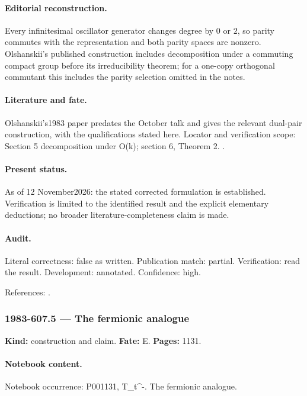 \paragraph{Editorial reconstruction.} Every infinitesimal oscillator generator changes degree by \(0\) or \(2\), so parity commutes with the representation and both parity spaces are nonzero. Olshanskii's published construction includes decomposition under a commuting compact group before its irreducibility theorem; for a one-copy orthogonal commutant this includes the parity selection omitted in the notes.

\paragraph{Literature and fate.} Olshanskii's1983 paper predates the October talk and gives the relevant dual-pair construction, with the qualifications stated here. Locator and verification scope: Section 5 decomposition under O(k); section 6, Theorem 2. \cite{olshanskii1983pairs}.

\paragraph{Present status.} As of 12 November2026: the stated corrected formulation is established. Verification is limited to the identified result and the explicit elementary deductions; no broader literature-completeness claim is made.

\paragraph{Audit.} Literal correctness: false as written. Publication match: partial. Verification: read the result. Development: annotated. Confidence: high.

\noindent References: \citep{olshanskii1983pairs}.\par

\subsubsection{1983-607.5 --- The fermionic analogue}

\label{item:1983-607.5}

\noindent\textbf{Kind:} construction and claim. \textbf{Fate:} E. \textbf{Pages:} 1131.\par

\paragraph{Notebook content.} Notebook occurrence: P001131, T_t^-. The fermionic analogue.

